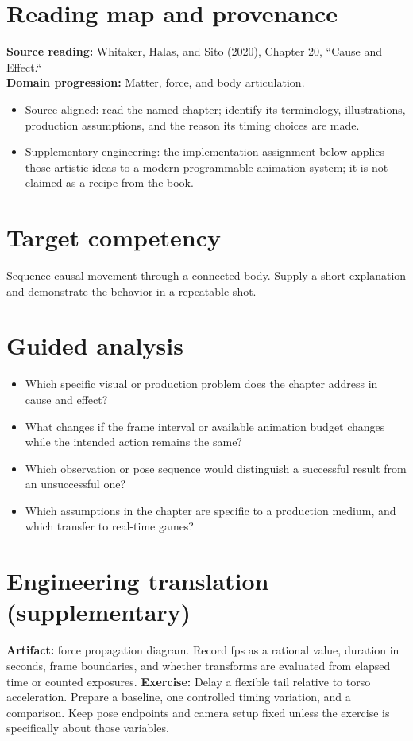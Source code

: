 \documentclass[10pt,letterpaper]{article}
\begin{document}
\makedoctitle
\makedocsummary

\section{Reading map and provenance}
\textbf{Source reading:} Whitaker, Halas, and Sito (2020), Chapter 20, ``Cause and Effect.``\\
\textbf{Domain progression:} Matter, force, and body articulation.
\begin{itemize}
\item Source-aligned: read the named chapter; identify its terminology, illustrations, production assumptions, and the reason its timing choices are made.
\item Supplementary engineering: the implementation assignment below applies those artistic ideas to a modern programmable animation system; it is not claimed as a recipe from the book.
\end{itemize}
\section{Target competency}
Sequence causal movement through a connected body. Supply a short explanation and demonstrate the behavior in a repeatable shot.
\section{Guided analysis}
\begin{itemize}
\item Which specific visual or production problem does the chapter address in cause and effect?
\item What changes if the frame interval or available animation budget changes while the intended action remains the same?
\item Which observation or pose sequence would distinguish a successful result from an unsuccessful one?
\item Which assumptions in the chapter are specific to a production medium, and which transfer to real-time games?
\end{itemize}
\section{Engineering translation (supplementary)}
\textbf{Artifact:} force propagation diagram. Record fps as a rational value, duration in seconds, frame boundaries, and whether transforms are evaluated from elapsed time or counted exposures.
\textbf{Exercise:} Delay a flexible tail relative to torso acceleration. Prepare a baseline, one controlled timing variation, and a comparison. Keep pose endpoints and camera setup fixed unless the exercise is specifically about those variables.
\end{document}
